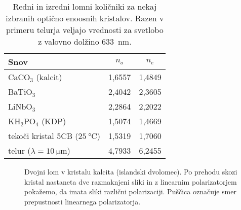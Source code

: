 \begin{table}[ht]
 \centering
\begin{tabular}{|l|c|c|} \hline  
      Snov & $n_o$ & $n_e$ \\ \hline
      CaCO$_3$ (kalcit) & 1,6557 & 1,4849 \\ \hline\index{CaCO$_3$|see {Kalcit}}
      BaTiO$_3$ & 2,4042 & 2,3605 \\ \hline \index{BaTiO$_3$}
      LiNbO$_3$ & 2,2864 & 2,2022 \\ \hline \index{LiNbO$_3$}
      KH$_2$PO$_4$ (KDP) & 1,5074 & 1,4669 \\ \hline \index{KH$_2$PO$_4$|see {KDP}}\index{KDP}
      tekoči kristal 5CB ($25~\si{\degreeCelsius}$) & 1,5319 & 1,7060 \\ 
      \hline \index{Tekoči kristali} \index{Telur}\index{Tekoči kristali!5CB}
      telur ($\lambda = 10~\si{\micro\metre}$) & 4,7933 & 6,2455 \\ 
\hline 
\end{tabular}
  \caption{Redni in izredni lomni količniki za nekaj izbranih optično enoosnih kristalov. Razen v primeru telurja
   veljajo vrednosti za svetlobo z valovno dolžino 633~\si{\nano\metre}.}
\label{table:none}
\end{table}
\newpage
\begin{figure}[ht]
\centering
\def\svgwidth{140truemm} 

\caption{Dvojni lom v kristalu kalcita (islandski dvolomec). 
Po prehodu skozi kristal nastaneta dve razmaknjeni sliki in z linearnim polarizatorjem 
pokažemo, da imata sliki različni polarizaciji. Puščica označuje smer prepustnosti
linearnega polarizatorja.}
\label{foto:dvolom}
\end{figure}
